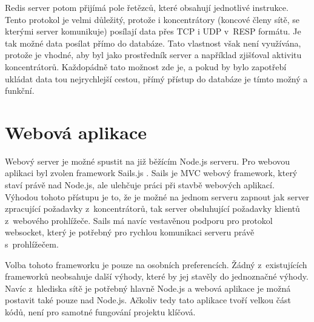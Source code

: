 Redis server potom přijímá pole řetězců, které obsahují jednotlivé instrukce. Tento protokol je velmi důležitý, protože i koncentrátory (koncové členy sítě, se kterými server komunikuje) posílají data přes TCP i UDP v~RESP formátu. Je tak možné data posílat přímo do databáze. Tato vlastnost však není využívána, protože je vhodné, aby byl jako prostředník server a na\-pří\-klad zjišťoval aktivitu koncentrátorů. Každopádně tato možnost zde je, a pokud by bylo zapotřebí ukládat data tou nejrychlejší cestou, přímý přístup do databáze je tímto možný a funkční.

\section{Webová aplikace}
Webový server je možné spustit na již běžícím Node.js serveru. Pro webovou aplikaci byl zvolen framework Sails.js \cite{sails}. Sails  je MVC webový framework, který staví právě nad Node.js,  ale ulehčuje práci při stavbě webových aplikací. Výhodou tohoto přístupu je to, že je možné na jednom serveru zapnout jak server zpracující požadavky z~koncentrátorů, tak server obsluhující požadavky klientů z~webového prohlížeče. Sails má navíc vestavěnou podporu pro protokol websocket, který je potřebný pro rychlou komunikaci serveru právě s~prohlížečem. 

Volba tohoto frameworku je pouze na osobních preferencích. Žádný z~existujících frameworků neobsahuje další výhody, které by jej stavěly do jednoznačné výhody. Navíc z~hlediska sítě je potřebný hlavně Node.js a webová aplikace je možná postavit také pouze nad Node.js. Ačkoliv tedy tato aplikace tvoří velkou část kódů, není pro samotné fungování projektu klíčová.